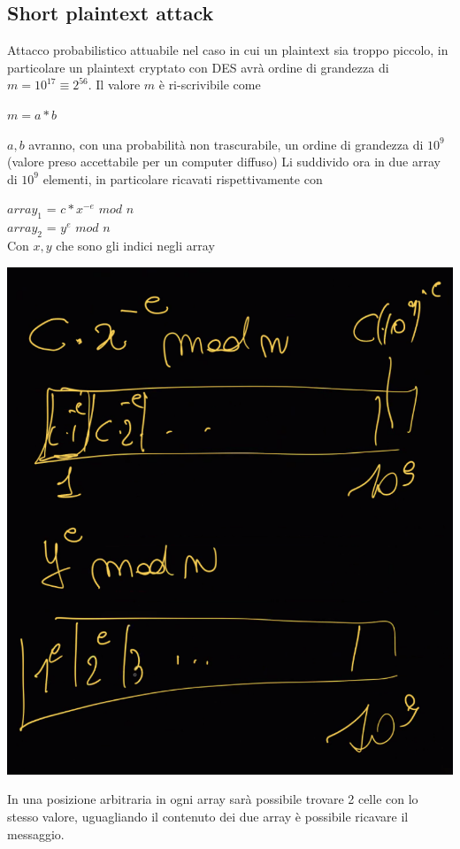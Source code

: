 \documentclass[11pt, oneside]{article}   	%
\begin{document}
\subsection*{Short plaintext attack}
Attacco probabilistico attuabile nel caso in cui un plaintext sia troppo piccolo, in particolare un plaintext cryptato con DES avrà ordine di grandezza di $m = 10^{17} \equiv 2^{56}$. Il valore $m$ è ri-scrivibile come \begin{center}
$m = a*b$
\end{center}
$a,b$ avranno, con una probabilità non trascurabile, un ordine di grandezza di $10^9$ (valore preso accettabile per un computer diffuso)
Li suddivido ora in due array di $10^9$ elementi, in particolare ricavati rispettivamente con
\begin{center}
$array_1$ = $c*x^{-e}$ $mod$ $n$\\
$array_2$ = $y^e$ $mod$ $n$\\
Con $x, y$ che sono gli indici negli array
\end{center}
\begin{center}
\includegraphics[scale= 0.4]{m1}
\end{center}
In una posizione arbitraria in ogni array sarà possibile trovare 2 celle con lo stesso valore, uguagliando il contenuto dei due array è possibile ricavare il messaggio.
\end{document}
